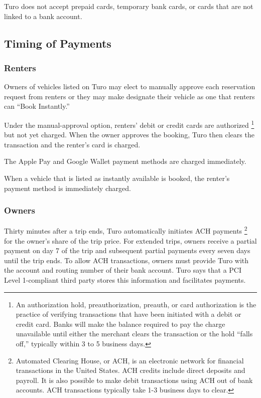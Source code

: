 \documentclass[review,12pt]{elsarticle}
\begin{document}
  Turo does not accept prepaid cards, temporary bank cards, or cards that are not linked to a bank account.
  \subsection{Timing of Payments}\label{timing}
    \subsubsection{Renters}
    Owners of vehicles listed on Turo may elect to manually approve each reservation request from renters or they may make designate their vehicle as one that renters can ``Book Instantly.''

    Under the manual-approval option, renters' debit or credit cards are authorized
    \footnote{An authorization hold, preauthorization, preauth, or card authorization is the practice of verifying transactions that have been initiated with a debit or credit card. Banks will make the balance required to pay the charge unavailable until either the merchant clears the transaction or the hold ``falls off,'' typically within 3 to 5 business days.
    }
    but not yet charged. When the owner approves the booking, Turo then clears the transaction and the renter's card is charged.

    The Apple Pay and Google Wallet payment methods are charged immediately.

    When a vehicle that is listed as instantly available is booked, the renter's payment method is immediately charged.

    \subsubsection{Owners}
    Thirty minutes after a trip ends, Turo automatically initiates ACH payments
    \footnote{Automated Clearing House, or ACH, is an electronic network for financial transactions in the United States. ACH credits include direct deposits and payroll. It is also possible to make debit transactions using ACH out of bank accounts. ACH transactions typically take 1-3 business days to clear.
    }
    for the owner's share of the trip price. For extended trips, owners receive a partial payment on day 7 of the trip and subsequent partial payments every seven days until the trip ends. To allow ACH transactions, owners must provide Turo with the account and routing number of their bank account. Turo says that a PCI Level 1-compliant third party stores this information and facilitates payments.
\end{document}
